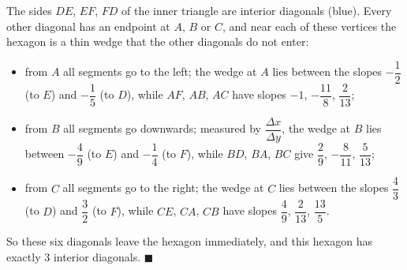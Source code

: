 The sides $DE$, $EF$, $FD$ of the inner triangle are interior diagonals (blue). Every other diagonal has an endpoint at $A$, $B$ or $C$, and near each of these vertices the hexagon is a thin wedge that the other diagonals do not enter:
\begin{itemize}
\item from $A$ all segments go to the left; the wedge at $A$ lies between the slopes $-\dfrac{1}{2}$ (to $E$) and $-\dfrac{1}{5}$ (to $D$), while $AF$, $AB$, $AC$ have slopes $-1$, $-\dfrac{11}{8}$, $\dfrac{2}{13}$;
\item from $B$ all segments go downwards; measured by $\dfrac{\Delta x}{\Delta y}$, the wedge at $B$ lies between $-\dfrac{4}{9}$ (to $E$) and $-\dfrac{1}{4}$ (to $F$), while $BD$, $BA$, $BC$ give $\dfrac{2}{9}$, $-\dfrac{8}{11}$, $\dfrac{5}{13}$;
\item from $C$ all segments go to the right; the wedge at $C$ lies between the slopes $\dfrac{4}{3}$ (to $D$) and $\dfrac{3}{2}$ (to $F$), while $CE$, $CA$, $CB$ have slopes $\dfrac{4}{9}$, $\dfrac{2}{13}$, $\dfrac{13}{5}$.
\end{itemize}
So these six diagonals leave the hexagon immediately, and this hexagon has exactly $3$ interior diagonals. $\blacksquare$

